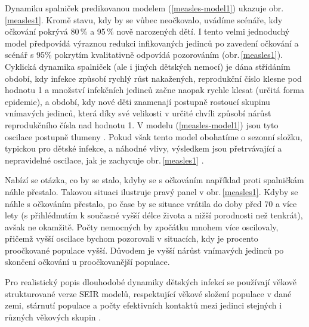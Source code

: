 Dynamiku spalniček predikovanou modelem (\ref{measles-model1}) ukazuje obr.\,\ref{measles1}. Kromě stavu, kdy by se vůbec neočkovalo, uvádíme scénáře, kdy očkování pokrývá 80\,\% a 95\,\% nově narozených dětí. I tento velmi jednoduchý model předpovídá výraznou redukci infikovaných jedinců po zavedení očkování a scénář s 95\% pokrytím kvalitativně odpovídá pozorováním (obr.\,\ref{measles1}). Cyklická dynamika spalniček (ale i jiných dětských nemocí) je dána střídáním období, kdy infekce způsobí rychlý růst nakažených, reprodukční číslo klesne pod hodnotu 1 a množství infekčních jedinců začne naopak rychle klesat (určitá forma epidemie), a období, kdy nové děti znamenají postupně rostoucí skupinu vnímavých jedinců, která díky své velikosti v určité chvíli způsobí nárůst reprodukčního čísla nad hodnotu 1. V modelu (\ref{measles-model1}) jsou tyto oscilace postupně tlumeny \cite{KeelingRohani2008}. Pokud však tento model obohatíme o sezonní složku, typickou pro dětské infekce, a náhodné vlivy, výsledkem jsou přetrvávající a nepravidelné oscilace, jak je zachycuje obr.\,\ref{measles1} \cite{KeelingRohani2008}. 

Nabízí se otázka, co by se stalo, kdyby se s očkováním například proti spalničkám náhle přestalo. Takovou situaci ilustruje pravý panel v obr.\,\ref{measles1}. Kdyby se náhle s očkováním přestalo, po čase by se situace vrátila do doby před 70 a více lety (s přihlédnutím k současné vyšší délce života a nižší porodnosti než tenkrát), avšak ne okamžitě. Počty nemocných by zpočátku mnohem více oscilovaly, přičemž vyšší oscilace bychom pozorovali v situacích, kdy je procento proočkované populace vyšší. Důvodem je vyšší nárůst vnímavých jedinců po skončení očkování u proočkovanější populace. 


Pro realistický popis dlouhodobé dynamiky dětských infekcí se používají věkově strukturované verze SEIR modelů, respektující věkové složení populace v dané zemi, stárnutí populace a počty efektivních kontaktů mezi jedinci stejných i různých věkových skupin \cite{KeelingRohani2008,VynnyckyWhite2010}.

